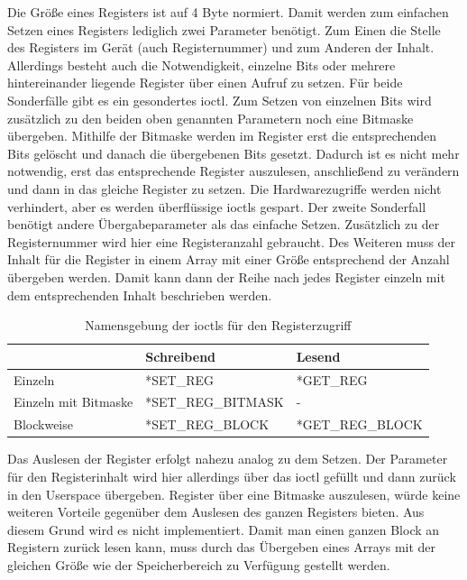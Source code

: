Die Größe eines Registers ist auf 4 Byte normiert. Damit werden zum einfachen Setzen eines Registers lediglich zwei Parameter benötigt. Zum Einen die Stelle des Registers im Gerät (auch Registernummer) und zum Anderen der Inhalt. 
Allerdings besteht auch die Notwendigkeit, einzelne Bits oder mehrere hintereinander liegende Register über einen Aufruf zu setzen. Für beide Sonderfälle gibt es ein gesondertes \ac{ioctl}. Zum Setzen von einzelnen Bits wird zusätzlich zu den beiden oben genannten Parametern noch eine Bitmaske übergeben. Mithilfe der Bitmaske werden im Register erst die entsprechenden Bits gelöscht und danach die übergebenen Bits gesetzt. Dadurch ist es nicht mehr notwendig, erst das entsprechende Register auszulesen, anschließend zu verändern und dann in das gleiche Register zu setzen. Die Hardwarezugriffe werden nicht verhindert, aber es werden überflüssige \ac{ioctl}s gespart.
Der zweite Sonderfall benötigt andere Übergabeparameter als das einfache Setzen. Zusätzlich zu der Registernummer wird hier eine Registeranzahl gebraucht. Des Weiteren muss der Inhalt für die Register in einem Array mit einer Größe entsprechend der Anzahl übergeben werden. Damit kann dann der Reihe nach jedes Register einzeln mit dem entsprechenden Inhalt beschrieben werden.\\


\begin{table}
\centering	
\begin{tabular}[h]{l|l|l}
	& Schreibend & Lesend \\
	\hline
	Einzeln & *SET\_REG & *GET\_REG\\
	\hline
	Einzeln mit Bitmaske & *SET\_REG\_BITMASK & - \\
	\hline
	Blockweise & *SET\_REG\_BLOCK & *GET\_REG\_BLOCK\\
\end{tabular}
\caption{Namensgebung der \ac{ioctl}s für den Registerzugriff} \label{tab:ioctl}
\end{table}


Das Auslesen der Register erfolgt nahezu analog zu dem Setzen. Der Parameter für den Registerinhalt wird hier allerdings über das \ac{ioctl} gefüllt und dann zurück in den Userspace übergeben. 
Register über eine Bitmaske auszulesen, würde keine weiteren Vorteile gegenüber dem Auslesen des ganzen Registers bieten. Aus diesem Grund wird es nicht implementiert.  
Damit man einen ganzen Block an Registern zurück lesen kann, muss durch das Übergeben eines Arrays mit der gleichen Größe wie der Speicherbereich zu Verfügung gestellt werden.\\

